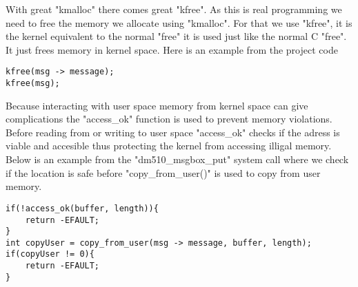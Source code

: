 \documentclass[12pt,a4paper]{report}
\begin{document}
With great "kmalloc" there comes great "kfree". As this is real programming we need to free the memory we allocate using "kmalloc". For that we use "kfree", it is the kernel equivalent to the normal "free" it is used just like the normal C "free". It just frees memory in kernel space. Here is an example from the project code
\begin{verbatim}
kfree(msg -> message);
kfree(msg);
\end{verbatim}
Because interacting with user space memory from kernel space can give complications the "access\_ok" function is used to prevent memory violations. Before reading from or writing to user space "access\_ok" checks if the adress is viable and accesible thus protecting the kernel from accessing illigal memory. Below is an example from the "dm510\_msgbox\_put" system call where we check if the location is safe before "copy\_from\_user()" is used to copy from user memory.
\begin{verbatim}
if(!access_ok(buffer, length)){
    return -EFAULT;
}
int copyUser = copy_from_user(msg -> message, buffer, length);
if(copyUser != 0){
    return -EFAULT;
}
\end{verbatim}
\end{document}
